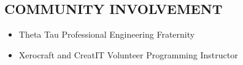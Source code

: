 \documentclass{res}
\begin{document}
\begin{resume}
\section{COMMUNITY INVOLVEMENT}
  \begin{itemize} \itemsep -2pt %
    \item Theta Tau Professional Engineering Fraternity
    \item Xerocraft and CreatIT Volunteer Programming Instructor
  \end{itemize}


\end{resume}
\end{document}
